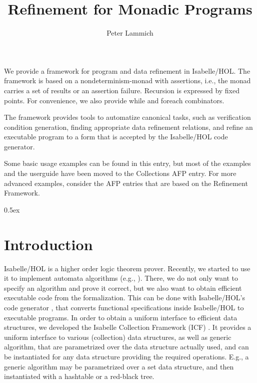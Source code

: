 \documentclass[11pt,a4paper]{book}
\makeatletter
\newenvironment{abstract}{%
  \small
  \begin{center}%
    {\bfseries \abstractname\vspace{-.5em}\vspace{\z@}}%
  \end{center}%
  \quotation}{\endquotation}
\makeatother
\begin{document}
\title{Refinement for Monadic Programs}
\author{Peter Lammich}
\maketitle

\begin{abstract}
  We provide a framework for program and data refinement in Isabelle/HOL.
  The framework is based on a nondeterminism-monad with assertions, i.e.,
  the monad carries a set of results or an assertion failure.
  Recursion is expressed by fixed points. For convenience, we also provide
  while and foreach combinators.

  The framework provides tools to automatize canonical tasks, such as 
  verification condition generation, finding appropriate data refinement relations,
  and refine an executable program to a form that is accepted by the 
  Isabelle/HOL code generator.

  Some basic usage examples can be found in this entry, but most of the examples and 
  the userguide have been moved to the Collections AFP entry. For more advanced examples,
  consider the AFP entries that are based on the Refinement Framework.
\end{abstract}

\clearpage
\tableofcontents

\clearpage

\parindent 0pt\parskip 0.5ex

\chapter{Introduction}
Isabelle/HOL\cite{NPW02} is a higher order logic theorem prover. Recently, we
started to use it to implement automata algorithms 
(e.g., \cite{L09_tree_automata}).
There, we do not only want to specify an algorithm and prove it correct, but
we also want to obtain efficient executable code from the formalization.
This can be done with Isabelle/HOL's code generator \cite{Haft09,HaNi10}, that 
converts
functional specifications inside Isabelle/HOL to executable programs. In order
to obtain a uniform interface to efficient data structures, we developed the
Isabelle Collection Framework (ICF) \cite{L09_collections,LL10}. 
It provides a uniform interface to various (collection) data structures, as well
as generic algorithm, that are parametrized over the data structure actually used,
and can be instantiated for any data structure providing the required operations.
E.g., a generic algorithm may be parametrized over a set data structure, and then
instantiated with a hashtable or a red-black tree.
\end{document}
